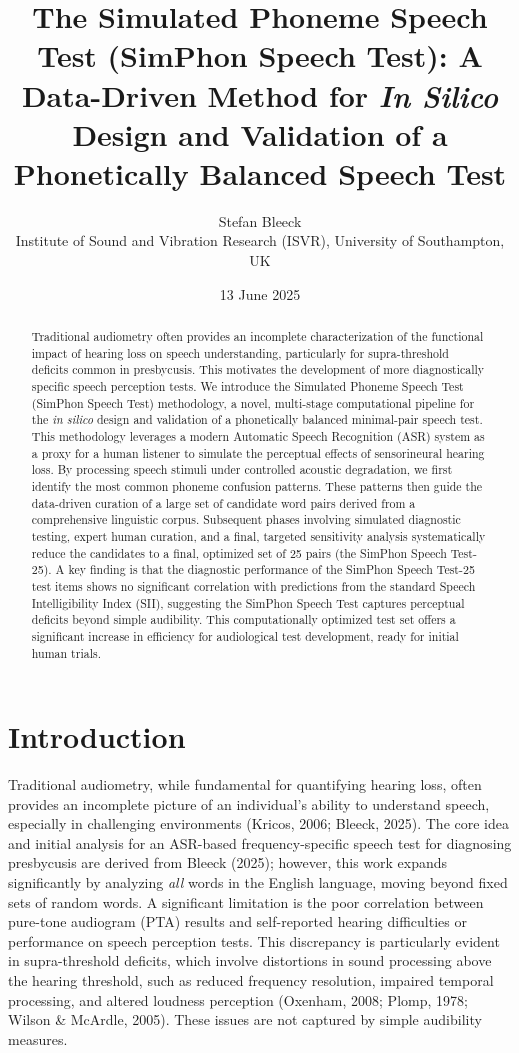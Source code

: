 \documentclass{article}
\title{The Simulated Phoneme Speech Test (SimPhon Speech Test): A Data-Driven Method for \textit{In Silico} Design and Validation of a Phonetically Balanced Speech Test}
\author{Stefan Bleeck \\ Institute of Sound and Vibration Research (ISVR), University of Southampton, UK}
\date{13 June 2025}
\begin{document}
\maketitle

\begin{abstract}
Traditional audiometry often provides an incomplete characterization of the functional impact of hearing loss on speech understanding, particularly for supra-threshold deficits common in presbycusis. This motivates the development of more diagnostically specific speech perception tests. We introduce the Simulated Phoneme Speech Test (SimPhon Speech Test) methodology, a novel, multi-stage computational pipeline for the \textit{in silico} design and validation of a phonetically balanced minimal-pair speech test. This methodology leverages a modern Automatic Speech Recognition (ASR) system as a proxy for a human listener to simulate the perceptual effects of sensorineural hearing loss. By processing speech stimuli under controlled acoustic degradation, we first identify the most common phoneme confusion patterns. These patterns then guide the data-driven curation of a large set of candidate word pairs derived from a comprehensive linguistic corpus. Subsequent phases involving simulated diagnostic testing, expert human curation, and a final, targeted sensitivity analysis systematically reduce the candidates to a final, optimized set of 25 pairs (the SimPhon Speech Test-25). A key finding is that the diagnostic performance of the SimPhon Speech Test-25 test items shows no significant correlation with predictions from the standard Speech Intelligibility Index (SII), suggesting the SimPhon Speech Test captures perceptual deficits beyond simple audibility. This computationally optimized test set offers a significant increase in efficiency for audiological test development, ready for initial human trials.
\end{abstract}

\section{Introduction}
Traditional audiometry, while fundamental for quantifying hearing loss, often provides an incomplete picture of an individual's ability to understand speech, especially in challenging environments (Kricos, 2006; Bleeck, 2025). The core idea and initial analysis for an ASR-based frequency-specific speech test for diagnosing presbycusis are derived from Bleeck (2025); however, this work expands significantly by analyzing \textit{all} words in the English language, moving beyond fixed sets of random words. A significant limitation is the poor correlation between pure-tone audiogram (PTA) results and self-reported hearing difficulties or performance on speech perception tests. This discrepancy is particularly evident in supra-threshold deficits, which involve distortions in sound processing above the hearing threshold, such as reduced frequency resolution, impaired temporal processing, and altered loudness perception (Oxenham, 2008; Plomp, 1978; Wilson \& McArdle, 2005). These issues are not captured by simple audibility measures.
\end{document}
